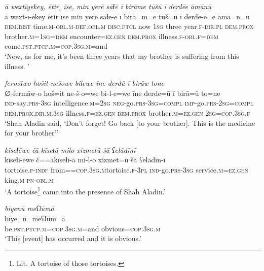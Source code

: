 \ea \label{DG.38}
\textit{ā wextīyekey, ētir, īse, min yerē sāɫē ī birāme tūšū ī derdēe āmānū} \\ 
\gll ā wext-ī-ekey ētir īse min yerē sāɫe-ē ī birā=m=e tūš=ū ī derde-ē=e āmā=n=ū \\ 
 \textsc{dem.dist} time\textsc{.m}\textsc{-obl}\textsc{.m}\textsc{-def}\textsc{.obl}\textsc{.m} \textsc{disc.ptcl} now \textsc{1sg} three year\textsc{\textsc{.f}}\textsc{-dir}\textsc{.pl} \textsc{dem.prox} brother\textsc{.m}\textsc{=1sg}\textsc{=dem} encounter\textsc{=ez}\textsc{.gen} \textsc{dem.prox} illness\textsc{\textsc{.f}}\textsc{-obl}\textsc{\textsc{.f}}\textsc{=dem} come\textsc{.pst}\textsc{.ptcp}\textsc{.m}\textsc{=cop}\textsc{.3sg}\textsc{.m}=and \\ 
\glt `Now, as for me, it’s been three years that my brother is suffering from this illness. '
\z 
 
\ea \label{DG.56}
\textit{fermāwo hošit nešowe bilewe īne derdū ī birāw tone} \\ 
\gll ∅-fermāw-o hoš=it ne-š-o=we bi-l-e=we īne derde=ū ī birā=ū to=ne \\ 
 \textsc{ind-}say\textsc{.prs}\textsc{-3sg} intelligence\textsc{.m}\textsc{=\textsc{2sg}} \textsc{neg-}go\textsc{.prs}\textsc{-3sg}\textsc{=\textsc{compl}} \textsc{imp-}go\textsc{.prs}-\textsc{2sg}\textsc{=compl} \textsc{dem.prox}\textsc{.dir}\textsc{.m}\textsc{.3sg} illness\textsc{\textsc{.f}}\textsc{=ez}\textsc{.gen} \textsc{dem.prox} brother\textsc{.m}\textsc{=ez}\textsc{.gen} \textsc{2sg}\textsc{=cop}\textsc{.3sg}\textsc{\textsc{.f}} \\ 
\glt `Shah Aladin said, ‘Don’t forget! Go back [to your brother]. This is the medicine for your brother’'
\z 
 
\ea \label{DG.61}
\textit{kīseɫēwe čā kīseɫā milo xizmetū šā ʕelādīnī} \\ 
\gll kīseɫī-ēwe č==ākīseɫī-ā mi-l-o xizmet=ū šā ʕelādīn-ī \\ 
 tortoise\textsc{\textsc{.f}}\textsc{-indf} from=\textsc{=cop}\textsc{.3sg}\textsc{.m}tortoise\textsc{\textsc{.f}}\textsc{-3pl} \textsc{ind-}go\textsc{.prs}\textsc{-3sg} service\textsc{.m}\textsc{=ez}\textsc{.gen} king\textsc{.m} \textsc{pn}\textsc{-obl}\textsc{.m} \\ 
\glt `A tortoise\footnote{Lit. A tortoise of those tortoises.}  came into the presence of Shah Aladin.'
\z 
 
\ea \label{DG.63}
\textit{bīyenū meʕlūmā} \\ 
\gll bīye=n=meʕlūm=ā \\ 
 be\textsc{.pst}\textsc{.ptcp}\textsc{.m}\textsc{=cop}\textsc{.3sg}\textsc{.m}=and obvious\textsc{=cop}\textsc{.3sg}\textsc{.m} \\ 
\glt `This [event] has occurred and it is obvious.'
\z 
 
